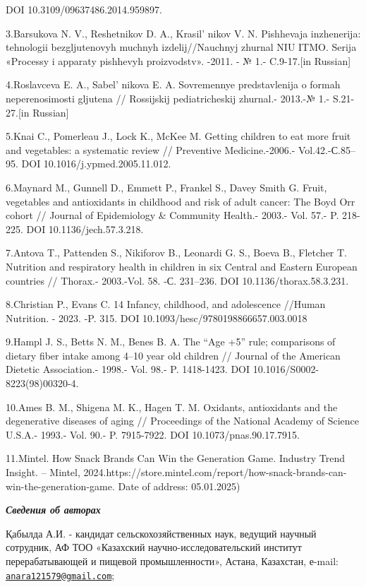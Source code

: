 {DOI 10.3109/09637486.2014.959897.

3.Barsukova N. V., Reshetnikov D. A., Krasil' nikov V. N.
Pishhevaja inzhenerija: tehnologii bezgljutenovyh muchnyh
izdelij//Nauchnyj zhurnal NIU ITMO. Serija «Processy i apparaty
pishhevyh proizvodstv». -2011. - № 1.- C.9-17.{[}in Russian{]}

4.Roslavceva E. A., Sabel' nikova E. A. Sovremennye
predstavlenija o formah neperenosimosti gljutena // Rossijskij
pediatricheskij zhurnal.- 2013.-№ 1.- S.21-27.{[}in Russian{]}

5.Knai C., Pomerleau J., Lock K., McKee M. Getting children to eat more
fruit and vegetables: a systematic review // Preventive Medicine.-2006.-
Vol.42.-С.85--95. DOI 10.1016/j.ypmed.2005.11.012.

6.Maynard M., Gunnell D., Emmett P., Frankel S., Davey Smith G. Fruit,
vegetables and antioxidants in childhood and risk of adult cancer: The
Boyd Orr cohort // Journal of Epidemiology \& Community Health.- 2003.-
Vol. 57.- P. 218-225. DOI 10.1136/jech.57.3.218.

7.Antova T., Pattenden S., Nikiforov B., Leonardi G. S., Boeva B.,
Fletcher T. Nutrition and respiratory health in children in six Central
and Eastern European countries // Thorax.- 2003.-Vol. 58. -С. 231--236.
DOI 10.1136/thorax.58.3.231.

8.Christian P., Evans C. 14 Infancy, childhood, and adolescence //Human
Nutrition. - 2023. -P. 315. DOI 10.1093/hesc/9780198866657.003.0018

9.Hampl J. S., Betts N. M., Benes B. A. The ``Age +5'' rule; comparisons
of dietary fiber intake among 4--10 year old children // Journal of the
American Dietetic Association.- 1998.- Vol. 98.- P. 1418-1423. DOI
10.1016/S0002-8223(98)00320-4.

10.Ames B. M., Shigena M. K., Hagen T. M. Oxidants, antioxidants and the
degenerative diseases of aging // Proceedings of the National Academy of
Science U.S.A.- 1993.- Vol. 90.- P. 7915-7922. DOI
10.1073/pnas.90.17.7915.

11.Mintel. How Snack Brands Can Win the Generation Game. Industry Trend
Insight. -- Mintel,
2024.https://store.mintel.com/report/how-snack-brands-can-win-the-generation-game.
Date of address: 05.01.2025)

\emph{{\bfseries Сведения об авторах}}

Қабылда А.И. - кандидат сельскохозяйственных наук, ведущий научный
сотрудник, АФ ТОО «Казахский научно-исследовательский институт
перерабатывающей и пищевой промышленности», Астана, Казахстан, е-mail:
\href{mailto:anara121579@gmail.com}{\nolinkurl{anara121579@gmail.com}};

}
